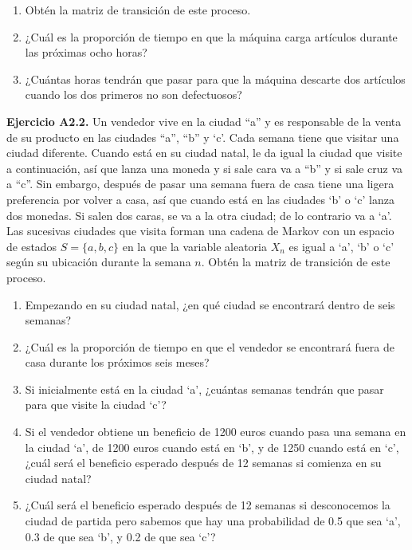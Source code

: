 \documentclass[
]{book}
\providecommand{\tightlist}{%
  \setlength{\itemsep}{0pt}\setlength{\parskip}{0pt}}
\theoremstyle{definition}
\theoremstyle{definition}
\theoremstyle{definition}
\theoremstyle{definition}
\theoremstyle{remark}
\begin{document}
\begin{enumerate}
\def\labelenumi{\arabic{enumi}.}
\setcounter{enumi}{3}
\tightlist
\item
  Obtén la matriz de transición de este proceso.
\item
  ¿Cuál es la proporción de tiempo en que la máquina carga artículos durante las próximas ocho horas?
\item
  ¿Cuántas horas tendrán que pasar para que la máquina descarte dos artículos cuando los dos primeros no son defectuosos?
\end{enumerate}

\textbf{Ejercicio A2.2.} Un vendedor vive en la ciudad ``a'' y es responsable de la venta de su producto en las ciudades ``a'', ``b'' y `c'. Cada semana tiene que visitar una ciudad diferente. Cuando está en su ciudad natal, le da igual la ciudad que visite a continuación, así que lanza una moneda y si sale cara va a ``b'' y si sale cruz va a ``c''. Sin embargo, después de pasar una semana fuera de casa tiene una ligera preferencia por volver a casa, así que cuando está en las ciudades `b' o `c' lanza dos monedas. Si salen dos caras, se va a la otra ciudad; de lo contrario va a `a'. Las sucesivas ciudades que visita forman una cadena de Markov con un espacio de estados \(S = \{a, b, c\}\) en la que la variable aleatoria \(X_n\) es igual a `a', `b' o `c' según su ubicación durante la semana \(n\). Obtén la matriz de transición de este proceso.

\begin{enumerate}
\def\labelenumi{\arabic{enumi}.}
\tightlist
\item
  Empezando en su ciudad natal, ¿en qué ciudad se encontrará dentro de seis semanas?
\item
  ¿Cuál es la proporción de tiempo en que el vendedor se encontrará fuera de casa durante los próximos seis meses?
\item
  Si inicialmente está en la ciudad `a', ¿cuántas semanas tendrán que pasar para que visite la ciudad `c'?
\item
  Si el vendedor obtiene un beneficio de 1200 euros cuando pasa una semana en la ciudad `a', de 1200 euros cuando está en `b', y de 1250 cuando está en `c', ¿cuál será el beneficio esperado después de 12 semanas si comienza en su ciudad natal?
\item
  ¿Cuál será el beneficio esperado después de 12 semanas si desconocemos la ciudad de partida pero sabemos que hay una probabilidad de 0.5 que sea `a', 0.3 de que sea `b', y 0.2 de que sea `c'?
\end{enumerate}
\end{document}
